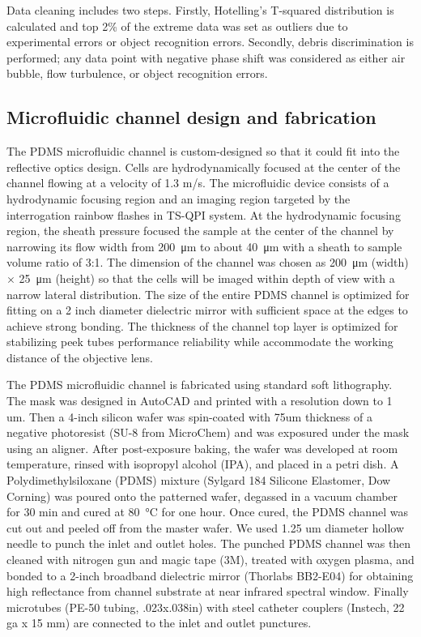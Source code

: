 \documentclass[aps,pra,reprint,superscriptaddress]{revtex4-1}
\begin{document}
Data cleaning includes two steps. Firstly, Hotelling's T-squared distribution is calculated and top 2\% of the extreme data was set as outliers due to experimental errors or object recognition errors. Secondly, debris discrimination is performed; any data point with negative phase shift was considered as either air bubble, flow turbulence, or object recognition errors.

\subsection{Microfluidic channel design and fabrication}

The PDMS microfluidic channel is custom-designed so that it could fit into the reflective optics design. Cells are hydrodynamically focused \cite{knight1998hydrodynamic,lee2006hydrodynamic} at the center of the channel flowing at a velocity of 1.3 m/s. The microfluidic device consists of a hydrodynamic focusing region and an imaging region targeted by the interrogation rainbow flashes in TS-QPI system. At the hydrodynamic focusing region, the sheath pressure focused the sample at the center of the channel by narrowing its flow width from \SI{200}{\micro\meter} to about \SI{40}{\micro\meter} with a sheath to sample volume ratio of 3:1. The dimension of the channel was chosen as \SI{200}{\micro\meter} (width) $\times$ \SI{25}{\micro\meter} (height) so that the cells will be imaged within depth of view with a narrow lateral distribution. The size of the entire PDMS channel is optimized for fitting on a 2 inch diameter dielectric mirror with sufficient space at the edges to achieve strong bonding. The thickness of the channel top layer is optimized for stabilizing peek tubes performance reliability while accommodate the working distance of the objective lens. 

The PDMS microfluidic channel is fabricated using standard soft lithography. The mask was designed in AutoCAD and printed with a resolution down to 1 um. Then a 4-inch silicon wafer was spin-coated with 75um thickness of a negative photoresist (SU-8 from MicroChem) and was exposured under the mask using an aligner. After post-exposure baking, the wafer was developed at room temperature, rinsed with isopropyl alcohol (IPA), and placed in a petri dish.  A Polydimethylsiloxane (PDMS) mixture (Sylgard 184 Silicone Elastomer, Dow Corning) was poured onto the patterned wafer, degassed in a vacuum chamber for 30 min and cured at \SI{80}{\degreeCelsius} for one hour. Once cured, the PDMS channel was cut out and peeled off from the master wafer. We used 1.25 um diameter hollow needle to punch the inlet and outlet holes. 
The punched PDMS channel was then cleaned with nitrogen gun and magic tape (3M), treated with oxygen plasma, and bonded to a 2-inch broadband dielectric mirror (Thorlabs BB2-E04) for obtaining high reflectance from channel substrate at near infrared spectral window. Finally microtubes (PE-50 tubing, .023x.038in) with steel catheter couplers (Instech, 22 ga x 15 mm) are connected to the inlet and outlet punctures.
\end{document}

